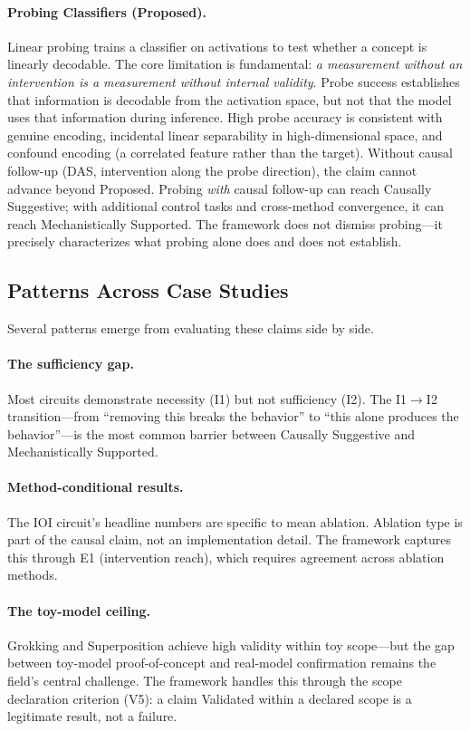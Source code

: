 \documentclass[10pt]{article}
\begin{document}
\paragraph{Probing Classifiers (Proposed).} Linear probing \citep{belinkov2022probing} trains a classifier on activations to test whether a concept is linearly decodable. The core limitation is fundamental: \emph{a measurement without an intervention is a measurement without internal validity}. Probe success establishes that information is decodable from the activation space, but not that the model uses that information during inference. High probe accuracy is consistent with genuine encoding, incidental linear separability in high-dimensional space, and confound encoding (a correlated feature rather than the target). Without causal follow-up (DAS, intervention along the probe direction), the claim cannot advance beyond Proposed. Probing \emph{with} causal follow-up can reach Causally Suggestive; with additional control tasks and cross-method convergence, it can reach Mechanistically Supported. The framework does not dismiss probing---it precisely characterizes what probing alone does and does not establish.

\subsection{Patterns Across Case Studies}

Several patterns emerge from evaluating these claims side by side.

\paragraph{The sufficiency gap.} Most circuits demonstrate necessity (I1) but not sufficiency (I2). The I1$\rightarrow$I2 transition---from ``removing this breaks the behavior'' to ``this alone produces the behavior''---is the most common barrier between Causally Suggestive and Mechanistically Supported.

\paragraph{Method-conditional results.} The IOI circuit's headline numbers are specific to mean ablation. Ablation type is part of the causal claim, not an implementation detail. The framework captures this through E1 (intervention reach), which requires agreement across ablation methods.

\paragraph{The toy-model ceiling.} Grokking and Superposition achieve high validity within toy scope---but the gap between toy-model proof-of-concept and real-model confirmation remains the field's central challenge. The framework handles this through the scope declaration criterion (V5): a claim Validated within a declared scope is a legitimate result, not a failure.
\end{document}
